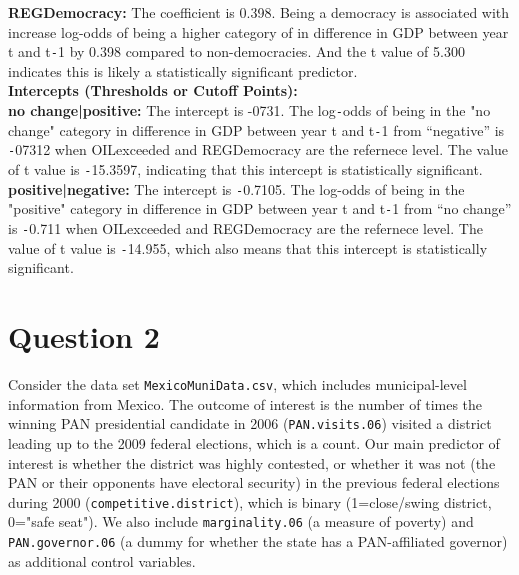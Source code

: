\documentclass[12pt,letterpaper]{article}
\begin{document}
\begin{enumerate}
	\textbf{REGDemocracy:} The coefficient is 0.398. Being a democracy is associated with increase  log-odds of being a higher category of in difference in GDP between year t and t\texttt{-}1 by 0.398 compared to non-democracies. And the t value of 5.300 indicates this is likely a statistically significant predictor.\\
	
	\textbf{Intercepts (Thresholds or Cutoff Points):}\\
	\textbf{no change|positive:} The intercept is -0731. The log\texttt{-}odds of being in the "no change" category in difference in GDP between year t and t\texttt{-}1 from “negative” is \texttt{-}07312 when OILexceeded and REGDemocracy are the refernece level. The value of t value is \texttt{-}15.3597, indicating that this intercept is statistically significant.\\
	\textbf{positive|negative: }The intercept is \texttt{-}0.7105. The log-odds of being in the "positive" category in difference in GDP between year t and t\texttt{-}1 from “no change” is \texttt{-}0.711 when OILexceeded and REGDemocracy are the refernece level. The value of t value is \texttt{-}14.955, which also means that this intercept is statistically significant.
\end{enumerate}

\section*{Question 2} 
\vspace{.25cm}

\noindent Consider the data set \texttt{MexicoMuniData.csv}, which includes municipal-level information from Mexico. The outcome of interest is the number of times the winning PAN presidential candidate in 2006 (\texttt{PAN.visits.06}) visited a district leading up to the 2009 federal elections, which is a count. Our main predictor of interest is whether the district was highly contested, or whether it was not (the PAN or their opponents have electoral security) in the previous federal elections during 2000 (\texttt{competitive.district}), which is binary (1=close/swing district, 0="safe seat"). We also include \texttt{marginality.06} (a measure of poverty) and \texttt{PAN.governor.06} (a dummy for whether the state has a PAN-affiliated governor) as additional control variables. 
\end{document}
